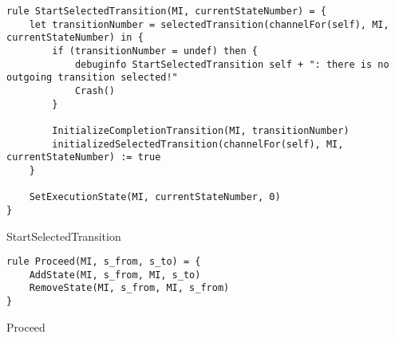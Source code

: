 \begin{listing}[H]
\begin{verbatim}
rule StartSelectedTransition(MI, currentStateNumber) = {
    let transitionNumber = selectedTransition(channelFor(self), MI, currentStateNumber) in {
        if (transitionNumber = undef) then {
            debuginfo StartSelectedTransition self + ": there is no outgoing transition selected!"
            Crash()
        }

        InitializeCompletionTransition(MI, transitionNumber)
        initializedSelectedTransition(channelFor(self), MI, currentStateNumber) := true
    }

    SetExecutionState(MI, currentStateNumber, 0)
}
\end{verbatim}
\caption{StartSelectedTransition}
\label{lst:asm:StartSelectedTransition}
\end{listing}






\begin{listing}[H]
\begin{verbatim}
rule Proceed(MI, s_from, s_to) = {
    AddState(MI, s_from, MI, s_to)
    RemoveState(MI, s_from, MI, s_from)
}
\end{verbatim}
\caption{Proceed}
\label{lst:asm:Proceed}
\end{listing}




